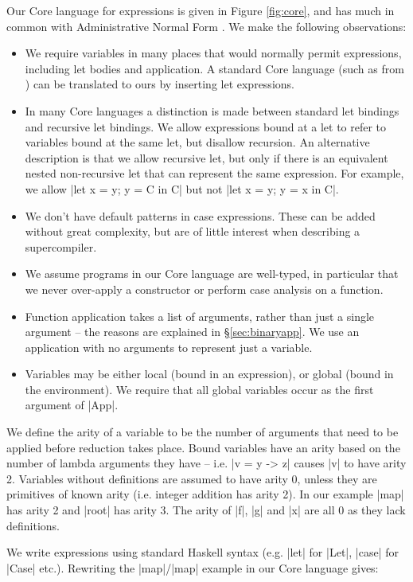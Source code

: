 \documentclass[draft]{sigplanconf}
\begin{document}
Our Core language for expressions is given in Figure \ref{fig:core}, and has much in common with Administrative Normal Form \cite{flanagan:continuations}. We make the following observations:

\begin{itemize}
\item We require variables in many places that would normally permit expressions, including let bodies and application. A standard Core language (such as from \citet{ghc_core}) can be translated to ours by inserting let expressions.
\item In many Core languages a distinction is made between standard let bindings and recursive let bindings. We allow expressions bound at a let to refer to variables bound at the same let, but disallow recursion. An alternative description is that we allow recursive let, but only if there is an equivalent nested non-recursive let that can represent the same expression. For example, we allow |let x = y; y = C in C| but not |let x = y; y = x in C|.
\item We don't have default patterns in case expressions. These can be added without great complexity, but are of little interest when describing a supercompiler.
\item We assume programs in our Core language are well-typed, in particular that we never over-apply a constructor or perform case analysis on a function.
\item Function application takes a list of arguments, rather than just a single argument -- the reasons are explained in \S\ref{sec:binaryapp}. We use an application with no arguments to represent just a variable.
\item Variables may be either local (bound in an expression), or global (bound in the environment). We require that all global variables occur as the first argument of |App|.
\end{itemize}

We define the arity of a variable to be the number of arguments that need to be applied before reduction takes place. Bound variables have an arity based on the number of lambda arguments they have -- i.e. |v = \x y -> z| causes |v| to have arity 2. Variables without definitions are assumed to have arity 0, unless they are primitives of known arity (i.e. integer addition has arity 2). In our example |map| has arity 2 and |root| has arity 3. The arity of |f|, |g| and |x| are all 0 as they lack definitions.

We write expressions using standard Haskell syntax (e.g. |let| for |Let|, |case| for |Case| etc.). Rewriting the |map|/|map| example in our Core language gives:
\end{document}
